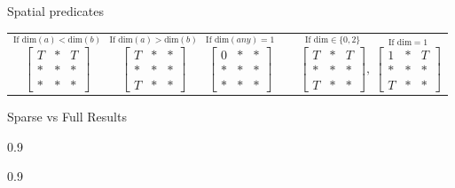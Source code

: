 \documentclass[11pt,ignorenonframetext,]{beamer}
\newenvironment{Shaded}{}{}
\newcommand{\KeywordTok}[1]{\textcolor[rgb]{0.00,0.44,0.13}{\textbf{#1}}}
\newcommand{\DataTypeTok}[1]{\textcolor[rgb]{0.56,0.13,0.00}{#1}}
\newcommand{\DecValTok}[1]{\textcolor[rgb]{0.25,0.63,0.44}{#1}}
\newcommand{\StringTok}[1]{\textcolor[rgb]{0.25,0.44,0.63}{#1}}
\newcommand{\OtherTok}[1]{\textcolor[rgb]{0.00,0.44,0.13}{#1}}
\newcommand{\OperatorTok}[1]{\textcolor[rgb]{0.40,0.40,0.40}{#1}}
\newcommand{\NormalTok}[1]{#1}
\let\oldShaded\Shaded
\let\endoldShaded\endShaded
\renewenvironment{Shaded}{\footnotesize\begin{spacing}{0.9}\oldShaded}{\endoldShaded\end{spacing}}
\begin{document}
\begin{frame}{Spatial predicates}
{\begin{tabular}{lll}
$\overset{\text{If dim}(a) < \text{dim}(b)}{\begin{bmatrix} T & * & T \\ * & * & * \\ * & * & * \end{bmatrix}} ~~~
\overset{\text{If dim}(a) > \text{dim}(b)}{\begin{bmatrix} T & * & * \\ * & * & * \\ T & * & * \end{bmatrix}} ~~~
\overset{\text{If dim}(any) = 1}{\begin{bmatrix} 0 & * & * \\ * & * & * \\ * & * & * \end{bmatrix}}$ & &
$\overset{\text{If dim} \in \{0,2\}}{\begin{bmatrix} T & * & T \\ * & * & * \\ T & * & * \end{bmatrix}} ,~
\overset{\text{If dim} = 1}{\begin{bmatrix} 1 & * & T \\ * & * & * \\ T & * & * \end{bmatrix}}$ \\
\end{tabular}
}

\end{frame}

\begin{frame}[fragile]{Sparse vs Full Results}

\begin{Shaded}
\end{Shaded}

\begin{Shaded}
\end{Shaded}

\end{frame}
\end{document}

